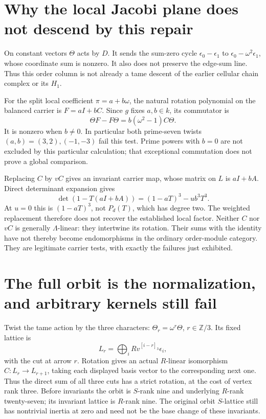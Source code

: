 \documentclass[11pt,oneside,openany]{book}
\theoremstyle{definition}\newtheorem{definition}[theorem]{Definition}
\theoremstyle{remark}\newtheorem{remark}[theorem]{Remark}
\begin{document}
\section{Why the local Jacobi plane does not descend by this repair}
On constant vectors $\Theta$ acts by $D$. It sends the sum-zero cycle $\epsilon_0-\epsilon_1$ to $\epsilon_0-\omega^2\epsilon_1$, whose coordinate sum is nonzero. It also does not preserve the edge-sum line. Thus this order column is not already a tame descent of the earlier cellular chain complex or its $H_1$.

For the split local coefficient $\pi=a+b\omega$, the natural rotation polynomial on the balanced carrier is $F=aI+bC$. Since $g$ fixes $a,b\in k$, its commutator is
\[
 \Theta F-F\Theta=b(\omega^2-1)C\Theta.
\]
It is nonzero when $b\ne0$. In particular both prime-seven twists $(a,b)=(3,2),(-1,-3)$ fail this test. Prime powers with $b=0$ are not excluded by this particular calculation; that exceptional commutation does not prove a global comparison.

Replacing $C$ by $vC$ gives an invariant carrier map, whose matrix on $L$ is $aI+bA$. Direct determinant expansion gives
\[
 \det(1-T(aI+bA))=(1-aT)^3-ub^3T^3.
\]
At $u=0$ this is $(1-aT)^3$, not $P_d(T)$, which has degree two. The weighted replacement therefore does not recover the established local factor. Neither $C$ nor $vC$ is generally $\Lambda$-linear: they intertwine its rotation. Their sums with the identity have not thereby become endomorphisms in the ordinary order-module category. They are legitimate carrier tests, with exactly the failures just exhibited.

\section{The full orbit is the normalization, and arbitrary kernels still fail}
Twist the tame action by the three characters: $\Theta_r=\omega^r\Theta$, $r\in\mathbb Z/3$. Its fixed lattice is
\[
 L_r=\bigoplus_i Rv^{[i-r]_3}\epsilon_i,
\]
with the cut at arrow $r$. Rotation gives an actual $R$-linear isomorphism $C:L_r\to L_{r+1}$, taking each displayed basis vector to the corresponding next one. Thus the direct sum of all three cuts has a strict rotation, at the cost of vertex rank three. Before invariants the orbit is $S$-rank nine and underlying $R$-rank twenty-seven; its invariant lattice is $R$-rank nine. The original orbit $S$-lattice still has nontrivial inertia at zero and need not be the base change of these invariants.
\end{document}

